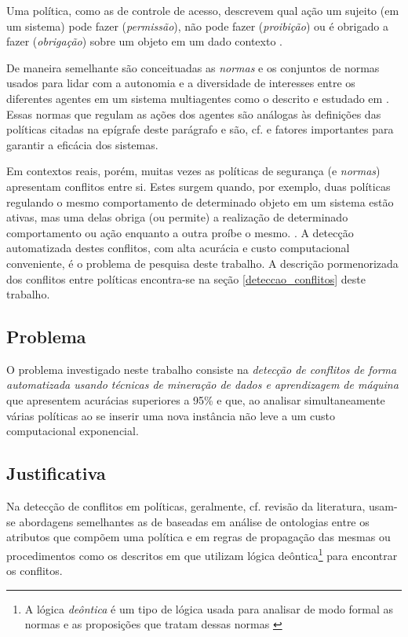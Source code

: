 Uma política, como as de controle de acesso, descrevem qual ação um sujeito (em um sistema) pode fazer (\textit{permissão}), não pode fazer (\textit{proibição}) ou é obrigado a fazer (\textit{obrigação}) sobre um objeto em um dado contexto \cite{sarkis2017}. 

De maneira semelhante são conceituadas as \textit{normas} e os conjuntos de normas usados para lidar com a autonomia e a diversidade de interesses entre os diferentes agentes em um sistema multiagentes como o descrito e estudado em \cite{eduardo2017}. Essas normas que regulam as ações dos agentes são análogas às definições das políticas citadas na epígrafe deste parágrafo e são, cf. \cite{eduardo2017} e \cite{sarkis:artigo:2016} fatores importantes para garantir a eficácia dos sistemas.

Em contextos reais, porém, muitas vezes as políticas de segurança (e \textit{normas}) apresentam conflitos entre si. Estes surgem quando, por exemplo, duas políticas regulando o mesmo comportamento de determinado objeto em um sistema estão ativas, mas uma delas obriga (ou permite) a realização de determinado comportamento ou ação enquanto a outra proíbe o mesmo. \cite{sarkis2017}\cite{eduardo2017}. A detecção automatizada destes conflitos, com alta acurácia e custo computacional conveniente, é o problema de pesquisa deste trabalho. A descrição pormenorizada dos conflitos entre políticas encontra-se na seção \ref{deteccao_conflitos} deste trabalho.
\subsection{Problema}\label{problema}
O problema investigado neste trabalho consiste na \textit{detecção de conflitos de forma automatizada usando técnicas de mineração de dados e aprendizagem de máquina} que apresentem acurácias superiores a 95\% e que, ao analisar simultaneamente várias políticas ao se inserir uma nova instância não leve a um custo computacional exponencial.
\subsection{Justificativa}\label{justificativa}
Na detecção de conflitos em políticas, geralmente, cf. revisão da literatura,  usam-se abordagens semelhantes as de \cite{sarkis2017} baseadas em análise de ontologias entre os atributos que compõem uma política e em regras de propagação das mesmas ou procedimentos como os descritos em \cite{eduardo2017} que utilizam lógica deôntica\footnote{A lógica \textit{deôntica} é um tipo de lógica usada para analisar de modo formal as normas e as proposições que tratam dessas normas \cite{eduardo2017} } para encontrar os conflitos. 

